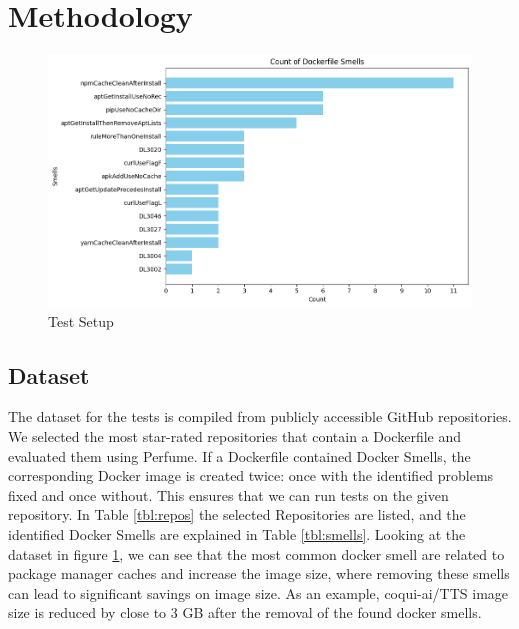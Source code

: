 \documentclass[conference]{IEEEtran}
\begin{document}
\section{Methodology}

\begin{figure}[t]
    \centering
    \includegraphics[width=\linewidth]{graphics/docker_smells_in_dataset.png}
    \caption{Test Setup}
    \label{fig:docker_smells}
\end{figure}
\subsection{Dataset}
The dataset for the tests is compiled from publicly accessible GitHub repositories. We selected the most star-rated repositories that contain a Dockerfile and evaluated them using Perfume. If a Dockerfile contained Docker Smells, the corresponding Docker image is created twice: once with the identified problems fixed and once without. This ensures that we can run tests on the given repository. In Table \ref{tbl:repos} the selected Repositories are listed, and the identified Docker Smells are explained in Table \ref{tbl:smells}. Looking at the dataset in figure \ref{fig:docker_smells}, we can see that the most common docker smell are related to package manager caches and increase the image size, where removing these smells can lead to significant savings on image size. As an example, coqui-ai/TTS image size is reduced by close to 3 GB after the removal of the found docker smells.
\end{document}
